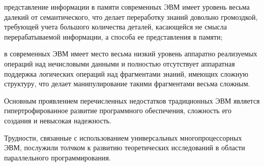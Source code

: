 \begin{SCn}
{\begin{scnitemize}
		\item представление информации в памяти современных ЭВМ имеет уровень весьма далекий от семантического, что делает переработку знаний довольно громоздкой, требующей учета большого количества деталей, касающейся не смысла перерабатываемой информации, а способа ее представления в памяти;
		\item в современных ЭВМ имеет место весьма низкий уровень аппаратно реализуемых операций над нечисловыми данными и полностью отсутствует аппаратная поддержка логических операций над фрагментами знаний, имеющих сложную структуру, что делает манипулирование такими фрагментами весьма сложным.

		\end{scnitemize}
	
	Основным проявлением перечисленных недостатков традиционных ЭВМ является гипертрофированное развитие программного обеспечения, сложность его создания и невысокая надежность.
	
	Трудности, связанные с использованием универсальных многопроцессорных ЭВМ, послужили толчком к развитию теоретических исследований в области параллельного программирования.}

	


\end{SCn}
